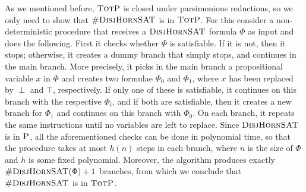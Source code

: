 %
%
As we mentioned before, $\text{\sc TotP}$ is closed under parsimonious reductions, so we only need to show that 
$\textsc{\#DisjHornSAT}$ is in $\text{\sc TotP}$. For this consider a non-deterministic procedure that receives a $\textsc{DisjHornSAT}$ formula $\Phi$ as input and does the following. First it checks whether $\Phi$ is satisfiable. If it is not, then it stops; otherwise, it creates a dummy branch that simply stops, and continues in the main branch. More precisely, it picks in the main branch a propositional variable $x$ in $\Phi$ and creates two formulae $\Phi_0$ and $\Phi_1$, where $x$ has been replaced by $\perp$ and $\top$, respectively. If only one of these is satisfiable, it continues on this branch with the respective $\Phi_i$, and if both are satisfiable, then it creates a new branch for $\Phi_1$ and continues on this branch with $\Phi_0$. On each branch, it repeats the same instructions until no variables are left to replace. Since $\textsc{DisjHornSAT}$ is in $\text{\sc P}$, all the aforementioned checks can be done in polynomial time, so that the procedure takes at most $h(n)$ steps in each branch, where $n$ is the size of $\Phi$ and $h$ is some fixed polynomial. Moreover, the algorithm produces exactly $\textsc{\#DisjHornSAT}(\Phi)+1$ branches, from which we conclude that $\textsc{\#DisjHornSAT}$ is in $\text{\sc TotP}$. 
